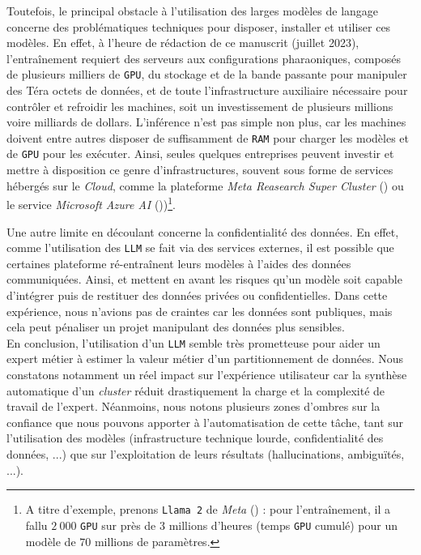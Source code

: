 			Toutefois, le principal obstacle à l'utilisation des larges modèles de langage concerne des problématiques techniques pour disposer, installer et utiliser ces modèles.
			En effet, à l'heure de rédaction de ce manuscrit (juillet 2023), l’entraînement requiert des serveurs aux configurations pharaoniques, composés de plusieurs milliers de \texttt{GPU}, du stockage et de la bande passante pour manipuler des Téra octets de données, et de toute l'infrastructure auxiliaire nécessaire pour contrôler et refroidir les machines, soit un investissement de plusieurs millions voire milliards de dollars.
			L'inférence n'est pas simple non plus, car les machines doivent entre autres disposer de suffisamment de \texttt{RAM} pour charger les modèles et de \texttt{GPU} pour les exécuter.
			Ainsi, seules quelques entreprises peuvent investir et mettre à disposition ce genre d'infrastructures, souvent sous forme de services hébergés sur le \textit{Cloud}, comme la plateforme \textit{Meta Reasearch Super Cluster} (\cite{lee-sengupta:2022:introducing-ai-research}) ou le service \textit{Microsoft Azure AI} (\cite{roach:2023:how-microsoft-bet}))\footnote{
			A titre d'exemple, prenons \texttt{Llama 2} de \textit{Meta} (\cite{touvron-etal:2023:llama-open-foundation}) : pour l’entraînement, il a fallu $2~000$ \texttt{GPU} sur près de $3$ millions d'heures (temps \texttt{GPU} cumulé) pour un modèle de $70$ millions de paramètres.
			}.
			
			Une autre limite en découlant concerne la confidentialité des données.
			En effet, comme l'utilisation des \texttt{LLM} se fait via des services externes, il est possible que certaines plateforme ré-entraînent leurs modèles à l'aides des données communiquées.
			Ainsi, \cite{huang-etal:2022:are-large-pretrained} et \cite{oneill-connor:2023:amplifying-limitations-harms} mettent en avant les risques qu'un modèle soit capable d'intégrer puis de restituer des données privées ou confidentielles.
			Dans cette expérience, nous n'avions pas de craintes car les données sont publiques, mais cela peut pénaliser un projet manipulant des données plus sensibles.
			\\
			
			En conclusion, l'utilisation d'un \texttt{LLM} semble très prometteuse pour aider un expert métier à estimer la valeur métier d'un partitionnement de données.
			Nous constatons notamment un réel impact sur l'expérience utilisateur car la synthèse automatique d'un \textit{cluster} réduit drastiquement la charge et la complexité de travail de l'expert.
			Néanmoins, nous notons plusieurs zones d'ombres sur la confiance que nous pouvons apporter à l'automatisation de cette tâche, tant sur l'utilisation des modèles (infrastructure technique lourde, confidentialité des données, ...) que sur l'exploitation de leurs résultats (hallucinations, ambiguïtés, ...).
		
